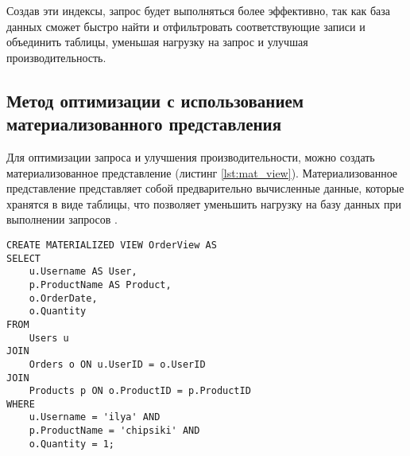\documentclass{bmstu}
\begin{document}
Создав эти индексы, запрос будет выполняться более эффективно, так как база данных сможет быстро найти и отфильтровать соответствующие записи и объединить таблицы, уменьшая нагрузку на запрос и улучшая производительность.

\subsection*{Метод оптимизации с использованием материализованного представления}
Для оптимизации запроса и улучшения производительности, можно создать материализованное 
представление (листинг \ref{lst:mat_view}). Материализованное представление представляет собой 
предварительно вычисленные данные, которые хранятся в виде таблицы, что позволяет 
уменьшить нагрузку на базу данных при выполнении запросов \cite{seventhOptSQL}.
\begin{lstlisting}[caption={Создание материализованного представления}, label=lst:mat_view]
CREATE MATERIALIZED VIEW OrderView AS
SELECT
    u.Username AS User,
    p.ProductName AS Product,
    o.OrderDate,
    o.Quantity
FROM
    Users u
JOIN
    Orders o ON u.UserID = o.UserID
JOIN
    Products p ON o.ProductID = p.ProductID
WHERE
    u.Username = 'ilya' AND 
    p.ProductName = 'chipsiki' AND
    o.Quantity = 1;
\end{lstlisting}
\end{document}
